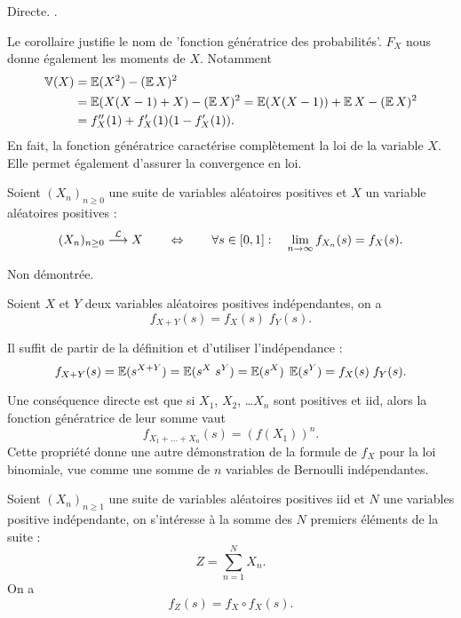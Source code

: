 \proof 
Directe.
\eproof.

\remark
Le corollaire justifie le nom de 'fonction génératrice des probabilités'. $F_X$ nous donne également les moments de $X$. Notamment
\begin{align*}
  \operatorname{\mathbb{V}}(X) 
  & = \operatorname{\mathbb{E}}(X^2) - (\operatorname{\mathbb{E}} X)^2 \\
  & = \operatorname{\mathbb{E}}(X(X-1) + X) - (\operatorname{\mathbb{E}} X)^2
  = \operatorname{\mathbb{E}}(X(X-1)) + \operatorname{\mathbb{E}} X - (\operatorname{\mathbb{E}} X)^2 \\
  & = f''_X(1) + f'_X(1)(1 - f'_X(1)). 
\end{align*}
En fait, la fonction génératrice caractérise complètement la loi de la variable $X$. Elle permet également d'assurer la convergence en loi.

\begin{proposition}
  Soient $(X_n)_{n \geq 0}$ une suite de variables aléatoires positives et $X$ un variable aléatoires positives :
  $$
  (X_n)_{n \geq 0} \overset{\mathcal{L}}{\longrightarrow} X
  \qquad \Leftrightarrow \qquad
  \forall s \in [0, 1]: \quad \lim_{n \to \infty} f_{X_n}(s) = f_X(s).
  $$
\end{proposition}

\proof Non démontrée. \eproof

\begin{proposition}
  Soient $X$ et $Y$ deux variables aléatoires positives indépendantes, on a
  $$
  f_{X+Y}(s) = f_X(s) \; f_Y(s).
  $$
\end{proposition}

\proof
Il suffit de partir de la définition et d'utiliser l'indépendance :
$$
f_{X+Y}(s) 
= \operatorname{\mathbb{E}}(s^{X+Y}) = \operatorname{\mathbb{E}}(s^X \; s^Y) = \operatorname{\mathbb{E}}(s^X) \;  \operatorname{\mathbb{E}}(s^Y)
= f_X(s) \; f_Y(s).
$$
\eproof

\remark
Une conséquence directe est que si $X_1$, $X_2$, \dots $X_n$ sont positives et iid, alors la fonction génératrice de leur somme vaut
$$
f_{X_1 + \dots + X_n}(s) = \left(f(X_1)\right)^n.
$$
Cette propriété donne une autre démonstration de la formule de $f_X$ pour la loi binomiale, vue comme une somme de $n$ variables de Bernoulli indépendantes.

\begin{proposition}
  Soient $(X_n)_{n \geq 1}$ une suite de variables aléatoires positives iid et $N$ une variables positive indépendante, on s'intéresse à la somme des $N$ premiers éléments de la suite :
  $$
  Z = \sum_{n=1}^N X_n.
  $$
  On a 
  $$
  f_{Z}(s) = f_X \circ f_X(s).
  $$
\end{proposition}

